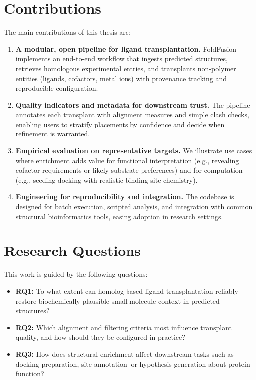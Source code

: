 \section{Contributions}
The main contributions of this thesis are:
\begin{enumerate}
    \item \textbf{A modular, open pipeline for ligand transplantation.} FoldFusion implements an end-to-end workflow that ingests predicted structures, retrieves homologous experimental entries, and transplants non-polymer entities (ligands, cofactors, metal ions) with provenance tracking and reproducible configuration.
    \item \textbf{Quality indicators and metadata for downstream trust.} The pipeline annotates each transplant with alignment measures and simple clash checks, enabling users to stratify placements by confidence and decide when refinement is warranted.
    \item \textbf{Empirical evaluation on representative targets.} We illustrate use cases where enrichment adds value for functional interpretation (e.g., revealing cofactor requirements or likely substrate preferences) and for computation (e.g., seeding docking with realistic binding-site chemistry).%
    \item \textbf{Engineering for reproducibility and integration.} The codebase is designed for batch execution, scripted analysis, and integration with common structural bioinformatics tools, easing adoption in research settings.
\end{enumerate}

\section{Research Questions}
This work is guided by the following questions:
\begin{itemize}
    \item \textbf{RQ1:} To what extent can homolog-based ligand transplantation reliably restore biochemically plausible small-molecule context in predicted structures?
    \item \textbf{RQ2:} Which alignment and filtering criteria most influence transplant quality, and how should they be configured in practice?
    \item \textbf{RQ3:} How does structural enrichment affect downstream tasks such as docking preparation, site annotation, or hypothesis generation about protein function?
\end{itemize}

